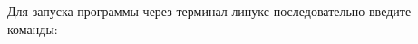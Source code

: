 Для запуска программы через терминал линукс последовательно введите команды\+:


\begin{DoxyCode}{0}

\end{DoxyCode}
 
